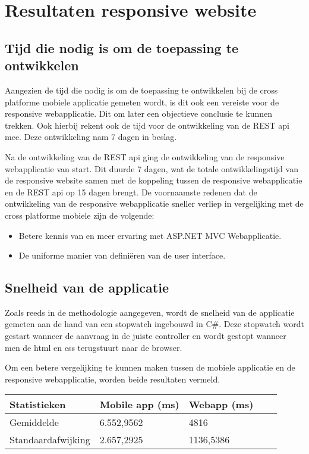 \chapter{Resultaten responsive website}
\label{ch:resultatenresponsivewebsite}
\section{Tijd die nodig is om de toepassing te ontwikkelen}
Aangezien de tijd die nodig is om de toepassing te ontwikkelen bij de cross platforme mobiele applicatie gemeten wordt,
is dit ook een vereiste voor de responsive webapplicatie. Dit om later een objectieve conclusie te kunnen trekken.
Ook hierbij rekent ook de tijd voor de ontwikkeling van de REST api mee. Deze ontwikkeling nam 7 dagen in beslag.

Na de ontwikkeling van de REST api ging de ontwikkeling van de responsive webapplicatie van start.
Dit duurde 7 dagen, wat de totale ontwikkelingstijd van de responsive website samen met de koppeling tussen de responsive webapplicatie
en de REST api op 15 dagen brengt. De voornaamste redenen dat de ontwikkeling van de responsive webapplicatie sneller verliep in vergelijking met de cross platforme mobiele zijn de volgende:
\begin{itemize}
  \item Betere kennis van en meer ervaring met ASP.NET MVC Webapplicatie.
  \item De uniforme manier van definiëren van de user interface.
\end{itemize}

\section{Snelheid van de applicatie}
Zoals reeds in de methodologie aangegeven, wordt de snelheid van de applicatie gemeten aan de hand van een stopwatch ingebouwd in C\#.
Deze stopwatch wordt gestart wanneer de aanvraag in de juiste controller en wordt gestopt wanneer men de html en css terugstuurt naar de browser.

Om een betere vergelijking te kunnen maken tussen de mobiele applicatie en de responsive webapplicatie, worden beide resultaten vermeld.

\begin{center}
\begin{tabular}{| l | l | l | | l | l }
  \hline
  Statistieken & Mobile app (ms) & Webapp (ms) \\ \hline
  Gemiddelde & 6.552,9562 & 4816 \\ \hline
  Standaardafwijking & 2.657,2925 & 1136,5386 \\
  \hline
\end{tabular}
\end{center}

